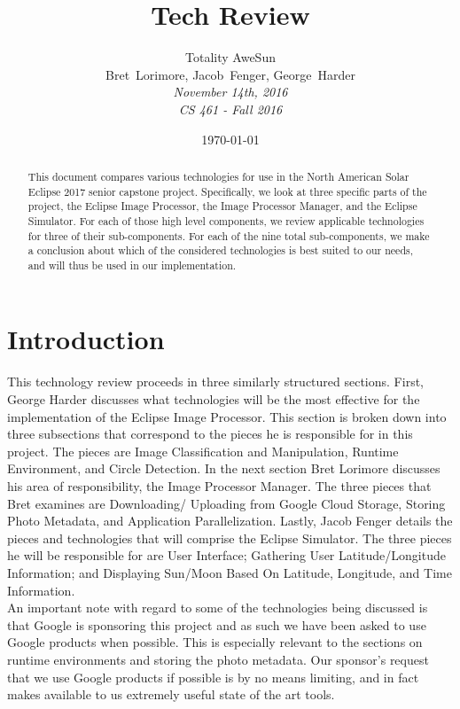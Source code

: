 \documentclass[10pt, onecolumn, draftclsnofoot, letterpaper, compsoc]{IEEEtran}
\title{Tech Review}
\date{\today} %
\author{Totality AweSun \\
		Bret~Lorimore, Jacob~Fenger, George~Harder \\
		\textit{November 14th, 2016 \\
		CS 461 - Fall 2016}}
\begin{document}
\maketitle

\begin{abstract}

This document compares various technologies for use in the North American Solar 
Eclipse 2017 senior capstone project. Specifically, we look at three specific parts
of the project, the Eclipse Image Processor, the Image Processor Manager, and the 
Eclipse Simulator. For each of those high level components, we review applicable
technologies for three of their sub-components. For each of the nine total sub-components,
we make a conclusion about which of the considered technologies is best suited to our 
needs, and will thus be used in our implementation.

\end{abstract}

\newpage

\section{Introduction} 

This technology review proceeds in three similarly structured sections. First,
George Harder discusses what technologies will be the most effective for the
implementation of the Eclipse Image Processor. This section is broken down into
three subsections that correspond to the pieces he is responsible for in this
project. The pieces are Image Classification and Manipulation, Runtime
Environment, and Circle Detection. In the next section Bret Lorimore discusses
his area of responsibility, the Image Processor Manager. The three pieces that
Bret examines are Downloading/ Uploading from Google Cloud Storage, Storing
Photo Metadata, and Application Parallelization. Lastly, Jacob Fenger details
the pieces and technologies that will comprise the Eclipse Simulator. The three
pieces he will be responsible for are User Interface; Gathering User
Latitude/Longitude Information; and Displaying Sun/Moon Based On Latitude,
Longitude, and Time Information. \\

An important note with regard to some of the technologies being discussed is
that Google is sponsoring this project and as such we have been asked to use
Google products when possible. This is especially relevant to the sections on
runtime environments and storing the photo metadata. Our sponsor's request that
we use Google products if possible is by no means limiting, and in fact makes
available to us extremely useful state of the art tools. \\
\end{document}

